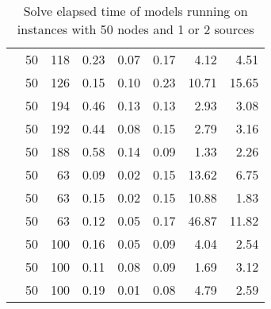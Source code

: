 \begin{table}[]
\begin{tabular}{rrrrrrrr}
                    & 50    & 118   & 0.23    & 0.07    & 0.17    & 4.12    & 4.51    \\
                    & 50    & 126   & 0.15    & 0.10    & 0.23    & 10.71   & 15.65   \\
                    & 50    & 194   & 0.46    & 0.13    & 0.13    & 2.93    & 3.08    \\
                    & 50    & 192   & 0.44    & 0.08    & 0.15    & 2.79    & 3.16    \\
                    & 50    & 188   & 0.58    & 0.14    & 0.09    & 1.33    & 2.26    \\
                    & 50    & 63    & 0.09    & 0.02    & 0.15    & 13.62   & 6.75    \\
                    & 50    & 63    & 0.15    & 0.02    & 0.15    & 10.88   & 1.83    \\
                    & 50    & 63    & 0.12    & 0.05    & 0.17    & 46.87   & 11.82   \\
                    & 50    & 100   & 0.16    & 0.05    & 0.09    & 4.04    & 2.54    \\
                    & 50    & 100   & 0.11    & 0.08    & 0.09    & 1.69    & 3.12    \\
                    & 50    & 100   & 0.19    & 0.01    & 0.08    & 4.79    & 2.59   
\end{tabular}
\caption{Solve elapsed time of models running on instances with 50 nodes and 1 or 2 sources}
\label{tab:time:50}
\end{table}



